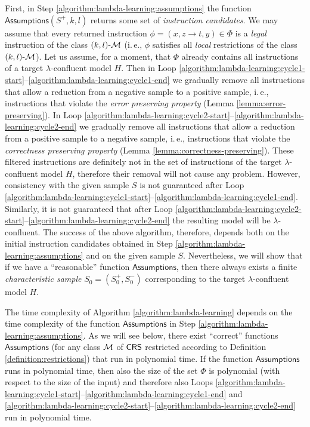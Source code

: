 First, in Step \ref{algorithm:lambda-learning:assumptions} the function $\mathsf{Assumptions}(S^+, k, l)$ returns some set of \emph{instruction candidates}. We may assume that every returned instruction $\phi = (x, z \to t, y) \in \Phi$ is a \emph{legal} instruction of the class $\textup{\sf $(k,l)$-\textup{\sf $\mathcal{M}$}}$ (i.\,e., $\phi$ satisfies all \emph{local} restrictions of the class $\textup{\sf $(k,l)$-\textup{\sf $\mathcal{M}$}}$). Let us assume, for a moment, that $\Phi$ already contains all instructions of a target $\lambda$-confluent model $H$. Then in Loop \ref{algorithm:lambda-learning:cycle1-start}--\ref{algorithm:lambda-learning:cycle1-end} we gradually remove all instructions that allow a reduction from a negative sample to a positive sample, i.\,e., instructions that violate the \emph{error preserving property} (Lemma \ref{lemma:error-preserving}). In Loop \ref{algorithm:lambda-learning:cycle2-start}--\ref{algorithm:lambda-learning:cycle2-end} we gradually remove all instructions that allow a reduction from a positive sample to a negative sample, i.\,e., instructions that violate the \emph{correctness preserving property} (Lemma \ref{lemma:correctness-preserving}). These filtered instructions are definitely not in the set of instructions of the target $\lambda$-confluent model $H$, therefore their removal will not cause any problem. However, consistency with the given sample $S$ is not guaranteed after Loop \ref{algorithm:lambda-learning:cycle1-start}--\ref{algorithm:lambda-learning:cycle1-end}. Similarly, it is not guaranteed that after Loop \ref{algorithm:lambda-learning:cycle2-start}--\ref{algorithm:lambda-learning:cycle2-end} the resulting model will be $\lambda$-confluent. The success of the above algorithm, therefore, depends both on the initial instruction candidates obtained in Step \ref{algorithm:lambda-learning:assumptions} and on the given sample $S$. Nevertheless, we will show that if we have a ``reasonable'' function $\mathsf{Assumptions}$, then there always exists a finite \emph{characteristic sample} $S_0 = (S_0^+, S_0^-)$ corresponding to the target $\lambda$-confluent model $H$.

The time complexity of Algorithm \ref{algorithm:lambda-learning} depends on the time complexity of the function $\mathsf{Assumptions}$ in Step \ref{algorithm:lambda-learning:assumptions}. As we will see below, there exist ``correct'' functions $\mathsf{Assumptions}$ (for any class $\textup{\sf $\mathcal{M}$}$ of $\textup{\sf CRS\/}$ restricted according to Definition \ref{definition:restrictions}) that run in polynomial time. If the function $\mathsf{Assumptions}$ runs in polynomial time, then also the size of the set $\Phi$ is polynomial (with respect to the size of the input) and therefore also Loops \ref{algorithm:lambda-learning:cycle1-start}--\ref{algorithm:lambda-learning:cycle1-end} and \ref{algorithm:lambda-learning:cycle2-start}--\ref{algorithm:lambda-learning:cycle2-end} run in polynomial time. 


